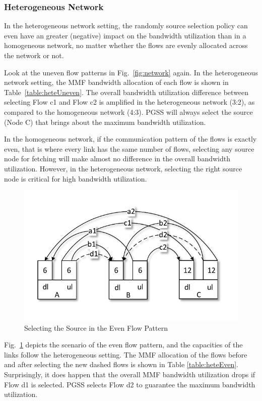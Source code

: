 \documentclass[10pt,journal,compsoc]{IEEEtran}
\begin{document}
\subsubsection{Heterogeneous Network}
In the heterogeneous network setting, the randomly source selection policy
can even have an greater (negative) impact on the
bandwidth utilization than in a homogeneous network, 
no matter whether the flows are evenly allocated across the network or not.

Look at the uneven flow patterns in Fig.~\ref{fig:network} again. 
In the heterogeneous network setting, 
the MMF bandwidth allocation of each flow is shown in Table~\ref{table:heteUneven}.
The overall bandwidth utilization difference between selecting Flow c1 and Flow c2 is amplified in the heterogeneous network (3:2),
as compared to the homogeneous network (4:3).
PGSS will always select the source (Node C) that brings about the maximum
bandwidth utilization.

In the homogeneous network, if the communication pattern of the flows
is exactly even, that is
where every link has the same number of flows, selecting any source
node for fetching
will make almost no difference in the overall bandwidth utilization. 
However, in the heterogeneous network, selecting the right source node
is critical for high bandwidth utilization.

\begin{figure}[!t]
\centering

\includegraphics[height=0.35\columnwidth]{figure4}

\caption{Selecting the Source in the Even Flow Pattern}
\label{fig:network3}
\end{figure}
 
Fig.~\ref{fig:network3} depicts the scenario of the even flow pattern, and the capacities of the links follow the heterogeneous setting.
The MMF allocation of the flows before and after
selecting the new dashed flows is shown in Table
\ref{table:heteEven}.
Surprisingly, it does happen that the overall MMF bandwidth utilization
drops if Flow d1 is selected.
PGSS selects Flow d2 to guarantee the maximum bandwidth utilization.
\end{document}
